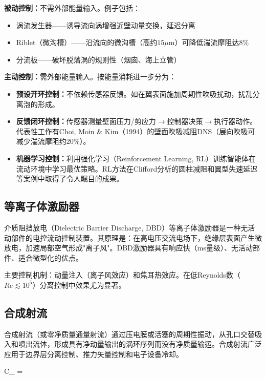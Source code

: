 \noindent\textbf{被动控制：}不需外部能量输入。例子包括：
\begin{itemize}
  \item 涡流发生器——诱导流向涡增强近壁动量交换，延迟分离
  \item Riblet（微沟槽）——沿流向的微沟槽（高约$15\mu$m）可降低湍流摩阻达$8\%$
  \item 分流板——破坏脱落涡的规则性（烟囱、海上立管）
\end{itemize}

\noindent\textbf{主动控制：}需外部能量输入。按能量消耗进一步分为：

\begin{itemize}
  \item \textbf{预设开环控制：}不依赖传感器反馈。如在翼表面施加周期性吹吸扰动，扰乱分离泡的形成。
  \item \textbf{反馈闭环控制：}传感器测量壁面压力/剪应力$\to$控制器决策$\to$执行器动作。代表性工作有Choi, Moin \& Kim（1994）的壁面吹吸减阻DNS（展向吹吸可减少湍流摩阻约$20\%$）。
  \item \textbf{机器学习控制：}利用强化学习（Reinforcement Learning, RL）训练智能体在流动环境中学习最优策略。RL方法在Clifford分析的圆柱减阻和翼型失速延迟等案例中取得了令人瞩目的成果。
\end{itemize}

\subsection{等离子体激励器}

介质阻挡放电（Dielectric Barrier Discharge, DBD）等离子体激励器是一种无活动部件的电控流动控制装置。其原理是：在高电压交流电场下，绝缘层表面产生微放电，加速局部空气形成"离子风"。DBD激励器具有响应快（ms量级）、无活动部件、适合微型化的优点。

主要控制机制：动量注入（离子风效应）和焦耳热效应。在低Reynolds数（$Re\lesssim 10^{5}$）分离控制中效果尤为显著。

\subsection{合成射流}

合成射流（或零净质量通量射流）通过压电膜或活塞的周期性振动，从孔口交替吸入和喷出流体，形成具有净动量输出的涡环序列而没有净质量输运。合成射流广泛应用于边界层分离控制、推力矢量控制和电子设备冷却。

\begin{myformula}
C_{\mu} = 
\end{myformula}

